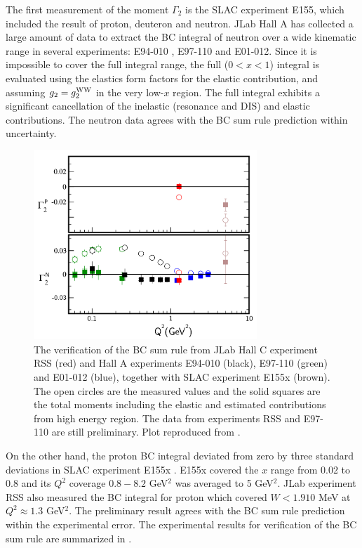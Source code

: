 The first measurement of the moment $\Gamma_2$ is the SLAC experiment E155, which included the result of proton, deuteron and neutron. JLab Hall A has collected a large amount of data to extract the BC integral of neutron over a wide kinematic range in several experiments: E94-010 \cite{Amarian2004a}, E97-110 and E01-012. Since it is impossible to cover the full integral range, the full ($0<x<1$) integral is evaluated using the elastics form factors for the elastic contribution, and assuming $g_2=g_2^{\mathrm{WW}}$ in the very low-$x$ region. The full integral exhibits a significant cancellation of the inelastic (resonance and DIS) and elastic contributions. The neutron data agrees with the BC sum rule prediction within uncertainty.

\begin{figure}[tb!]
  \centering
  \includegraphics[width=0.75\textwidth]{figs/BC_all.png}
  \caption[The verification of the BC sum rule.]{The verification of the BC sum rule from JLab Hall C experiment RSS (red) and Hall A experiments E94-010 \cite{Amarian2004a} (black), E97-110 (green) and E01-012 (blue), together with SLAC experiment E155x \cite{Anthony2003} (brown). The open circles are the measured values and the solid squares are the total moments including the elastic and estimated contributions from high energy region. The data from experiments RSS and E97-110 are still preliminary. Plot reproduced from \cite{Chen2010}. \label{C4S3F1}}
\end{figure}

On the other hand, the proton BC integral deviated from zero by three standard deviations in SLAC experiment E155x \cite{Abe1998}. E155x covered the $x$ range from 0.02 to 0.8 and its $Q^2$ coverage $0.8-8.2$ GeV${}^2$ was averaged to 5 GeV${}^2$. JLab experiment RSS also measured the BC integral for proton which covered $W<1.910$ MeV at $Q^2\approx1.3$ GeV${}^2$. The preliminary result agrees with the BC sum rule prediction within the experimental error. The experimental results for verification of the BC sum rule are summarized in .

